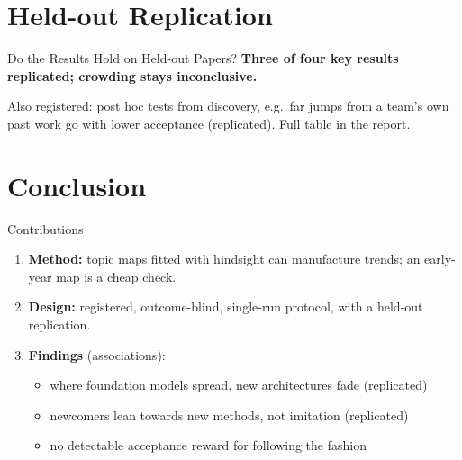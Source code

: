 \documentclass[aspectratio=169,11pt]{beamer}
\newcommand{\gnote}[1]{{\color{note}#1}}
\begin{document}
\section{Held-out Replication}

\begin{frame}{Do the Results Hold on Held-out Papers?}
  \centering
  \textbf{Three of four key results replicated; crowding stays inconclusive.}
  \begin{table}
    \centering\small\setlength{\tabcolsep}{4pt}
    
    \caption{11,099 papers from a released former test split, never analysed before one registered run: an
    out-of-sample replication, not a certified untouched holdout. Supported: one-sided Holm $p < 0.05$; pp.
    \dag\,Too weak to tell (below MDE$_{80}$).}
  \end{table}
  \vspace{0.3em}
  \gnote{\small Also registered: post hoc tests from discovery, e.g.\ far jumps from a team's own past work go with
  lower acceptance (replicated). Full table in the report.}
\end{frame}

\section{Conclusion}

\begin{frame}{Contributions}
  \begin{enumerate}\setlength{\itemsep}{0.9em}
    \item \textbf{Method:} topic maps fitted with hindsight can manufacture trends; an early-year map is a cheap
      check.
    \item \textbf{Design:} registered, outcome-blind, single-run protocol, with a held-out replication.
    \item \textbf{Findings} (associations):
      \begin{itemize}
        \item where foundation models spread, new architectures fade \alert{(replicated)}
        \item newcomers lean towards new methods, not imitation \alert{(replicated)}
        \item no detectable acceptance reward for following the fashion
      \end{itemize}
  \end{enumerate}
\end{frame}
\end{document}
